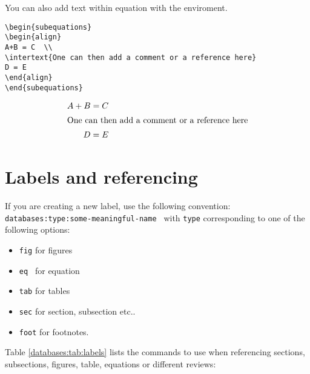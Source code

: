 %
You can also add text within equation with the {\tt \string\intertex} enviroment.
\begin{verbatim}
\begin{subequations}
\begin{align}
A+B = C  \\
\intertext{One can then add a comment or a reference here}
D = E 
\end{align}
\end{subequations}
\end{verbatim}
\begin{subequations}
\begin{align}
A+B = C  \\
\intertext{One can then add a comment or a reference here}
D = E 
\end{align}
\end{subequations}



\section{Labels and referencing}


If you are creating a new label, use the following convention: {\tt databases:type:some-meaningful-name }
with {\tt type} corresponding to one of the following options:
\begin{itemize}
\item {\tt fig} for figures
\item {\tt eq } for equation
\item {\tt tab} for tables
\item {\tt sec} for section, subsection etc..
\item {\tt foot} for footnotes.
\end{itemize}
Table \ref{databases:tab:labels} lists the commands to use when referencing sections, subsections, figures, table, equations or different reviews:


